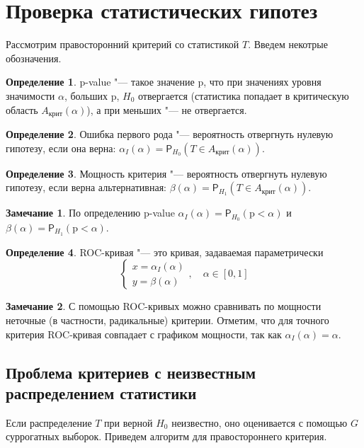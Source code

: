 \documentclass[specialist,
substylefile = spbu_report.rtx,
subf,href,colorlinks=true, 12pt]{disser}
\theoremstyle{definition}
\newtheorem{definition}{Определение}
\newtheorem{remark}{Замечание}
\begin{document}
\section{Проверка статистических гипотез}\label{sect:hypothesis}
Рассмотрим правосторонний критерий со статистикой $T$. Введем некотрые обозначения.
\begin{definition}
	p-value "--- такое значение $\mathrm p$, что при значениях уровня значимости $\alpha$, больших $\mathrm p$, $H_0$ отвергается (статистика попадает в критическую область $A_\text{крит}(\alpha)$), а при меньших "--- не отвергается.
\end{definition}
\begin{definition}
	Ошибка первого рода "--- вероятность отвергнуть нулевую гипотезу, если она верна: $\alpha_I(\alpha)=\mathsf P_{H_0}(T\in A_\text{крит}(\alpha))$.
\end{definition}
\begin{definition}
	Мощность критерия "--- вероятность отвергнуть нулевую гипотезу, если верна альтернативная: $\beta(\alpha)=\mathsf P_{H_1}(T\in A_\text{крит}(\alpha))$.
\end{definition}
\begin{remark}
	По определению p-value $\alpha_I(\alpha)=\mathsf P_{H_0}(\mathrm p < \alpha)$ и $\beta(\alpha)=\mathsf P_{H_1}(\mathrm p < \alpha)$.
\end{remark}
\begin{definition}
	ROC-кривая "--- это кривая, задаваемая параметрически
	\[
		\begin{cases}
			x=\alpha_I(\alpha) \\
			y=\beta(\alpha)
		\end{cases},\quad \alpha\in[0,1]
	\]
\end{definition}
\begin{remark}
	С помощью ROC-кривых можно сравнивать по мощности неточные (в частности, радикальные) критерии. Отметим, что для точного критерия ROC-кривая совпадает с графиком мощности, так как $\alpha_I(\alpha)=\alpha$.
\end{remark}

\subsection{Проблема критериев с неизвестным распределением статистики}\label{sect:problem}
Если распределение $T$ при верной $H_0$ неизвестно, оно оценивается с помощью $G$ суррогатных выборок. Приведем алгоритм для правостороннего критерия.
\end{document}
